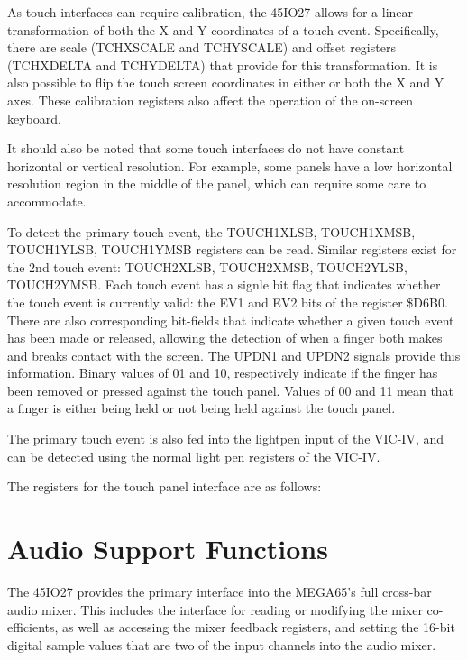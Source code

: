 As touch interfaces can require calibration, the 45IO27 allows for a
linear transformation of both the X and Y coordinates of a touch
event.  Specifically, there are scale (TCHXSCALE and TCHYSCALE) and
offset registers (TCHXDELTA and TCHYDELTA) that provide for this
transformation. It is also possible to flip the touch screen
coordinates in either or both the X and Y axes.  These calibration
registers also affect the operation of the on-screen keyboard.

It should also be noted that some touch interfaces do not have
constant horizontal or vertical resolution. For example, some panels
have a low horizontal resolution region in the middle of the panel,
which can require some care to accommodate.

To detect the primary touch event, the TOUCH1XLSB, TOUCH1XMSB, TOUCH1YLSB,
TOUCH1YMSB registers can be read.  Similar registers exist for the 2nd
touch event: TOUCH2XLSB, TOUCH2XMSB, TOUCH2YLSB, TOUCH2YMSB. Each
touch event has a signle bit flag that indicates whether the touch
event is currently valid: the EV1 and EV2 bits of the register
\$D6B0.  There are also corresponding bit-fields that indicate whether a
given touch event has been made or released, allowing the detection of
when a finger both makes and breaks contact with the screen.  The
UPDN1 and UPDN2 signals provide this information.  Binary values of 01 and
10, respectively indicate if the finger has been removed or pressed
against the touch panel.  Values of 00 and 11 mean that a finger is
either being held or not being held against the touch panel.

The
primary touch event is also fed into the lightpen input of the VIC-IV,
and can be detected using the normal light pen registers of the VIC-IV.

The registers for the touch panel interface are as follows:



\section{Audio Support Functions}
The 45IO27 provides the primary interface into the MEGA65's full
cross-bar audio mixer. This includes the interface for reading or
modifying the mixer co-efficients, as well as accessing the mixer
feedback registers, and setting the 16-bit digital sample values that
are two of the input channels into the audio mixer.


